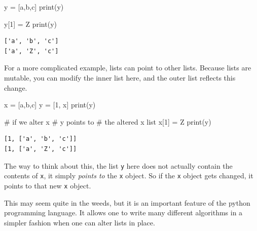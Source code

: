 \documentclass[
  letterpaper,
]{scrbook}
\newenvironment{Shaded}{\begin{snugshade}}{\end{snugshade}}
\newcommand{\BuiltInTok}[1]{\textcolor[rgb]{0.00,0.23,0.31}{#1}}
\newcommand{\CommentTok}[1]{\textcolor[rgb]{0.37,0.37,0.37}{#1}}
\newcommand{\DecValTok}[1]{\textcolor[rgb]{0.68,0.00,0.00}{#1}}
\newcommand{\NormalTok}[1]{\textcolor[rgb]{0.00,0.23,0.31}{#1}}
\newcommand{\OperatorTok}[1]{\textcolor[rgb]{0.37,0.37,0.37}{#1}}
\newcommand{\StringTok}[1]{\textcolor[rgb]{0.13,0.47,0.30}{#1}}
\begin{document}
\begin{Shaded}
\begin{Highlighting}[]
\NormalTok{y }\OperatorTok{=}\NormalTok{ [}\StringTok{\textquotesingle{}a\textquotesingle{}}\NormalTok{,}\StringTok{\textquotesingle{}b\textquotesingle{}}\NormalTok{,}\StringTok{\textquotesingle{}c\textquotesingle{}}\NormalTok{]}
\BuiltInTok{print}\NormalTok{(y)}

\NormalTok{y[}\DecValTok{1}\NormalTok{] }\OperatorTok{=} \StringTok{\textquotesingle{}Z\textquotesingle{}}
\BuiltInTok{print}\NormalTok{(y)}
\end{Highlighting}
\end{Shaded}

\begin{verbatim}
['a', 'b', 'c']
['a', 'Z', 'c']
\end{verbatim}

For a more complicated example, lists can point to other lists. Because
lists are mutable, you can modify the inner list here, and the outer
list reflects this change.

\begin{Shaded}
\begin{Highlighting}[]
\NormalTok{x }\OperatorTok{=}\NormalTok{ [}\StringTok{\textquotesingle{}a\textquotesingle{}}\NormalTok{,}\StringTok{\textquotesingle{}b\textquotesingle{}}\NormalTok{,}\StringTok{\textquotesingle{}c\textquotesingle{}}\NormalTok{]}
\NormalTok{y }\OperatorTok{=}\NormalTok{ [}\DecValTok{1}\NormalTok{, x]}
\BuiltInTok{print}\NormalTok{(y)}

\CommentTok{\# if we alter x}
\CommentTok{\# y points to }
\CommentTok{\# the altered x list}
\NormalTok{x[}\DecValTok{1}\NormalTok{] }\OperatorTok{=} \StringTok{\textquotesingle{}Z\textquotesingle{}}
\BuiltInTok{print}\NormalTok{(y)}
\end{Highlighting}
\end{Shaded}

\begin{verbatim}
[1, ['a', 'b', 'c']]
[1, ['a', 'Z', 'c']]
\end{verbatim}

The way to think about this, the list \texttt{y} here does not actually
contain the contents of \texttt{x}, it simply \emph{points to} the
\texttt{x} object. So if the \texttt{x} object gets changed, it points
to that new \texttt{x} object.

This may seem quite in the weeds, but it is an important feature of the
python programming language. It allows one to write many different
algorithms in a simpler fashion when one can alter lists in place.
\end{document}
